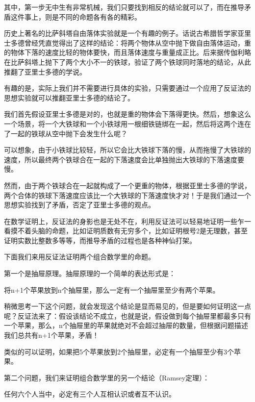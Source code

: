 \documentclass[export, 12pt, letterpaper]{ctexrep}
\newenvironment{shadedquotation}
 {\begin{shaded*}
  \quoting[leftmargin=5pt, rightmargin=5pt, vskip=0pt]
 }
 {\endquoting
 \end{shaded*}
}
\begin{document}
其中，第一步无中生有非常机械，我们只要找到相反的结论就可以了，而在推导矛盾这件事上，则是不同的命题各有各的精彩。

历史上著名的比萨斜塔自由落体实验就是一个有趣的例子。话说古希腊哲学家亚里士多德曾经凭直觉得出了这样的结论：将两个物体从空中抛下做自由落体运动，重的物体下落的速度比轻的物体要快，而且落体速度与重量成正比。后来据传伽利略在比萨斜塔上抛下了两个大小不一的铁球，验证了两个铁球同时落地的结论，从此推翻了亚里士多德的学说。

有趣的是，实际上我们并不需要进行具体的实验，只需要通过一个应用了反证法的思想实验就可以推翻亚里士多德的结论了。

我们首先假设亚里士多德是对的，也就是重的物体会下落得更快。然后，想象这么一个场景，将一个大铁球和一个小铁球用一根细铁链绑在一起，然后将这两个连在了一起的铁球从空中抛下会发生什么呢？

可以想象，由于小铁球比较轻，所以它会比大铁球下落的慢，从而拖慢了大铁球的速度，所以最终两个铁球合在一起的下落速度会比单独抛出大铁球的下落速度要慢。

然而，由于两个铁球合在一起就构成了一个更重的物体，根据亚里士多德的学说，两个合体的铁球下落速度应该比一个大铁球的下落速度快才对！于是我们通过一个思想实验找到了矛盾，否定了亚里士多德的观点。

在数学证明上，反证法的身影也是无处不在，利用反证法可以轻易地证明一些乍一看摸不着头脑的命题，比如证明质数有无穷多个，比如证明根号2是无理数，甚至证明实数比整数多等等，而推导矛盾的过程也是各种神仙打架。

下面我们来用反证法证明两个组合数学里的命题。

第一个是抽屉原理。抽屉原理的一个简单的表达形式是：

\begin{shadedquotation}
\noindent
将n+1个苹果放到n个抽屉里，那么一定有一个抽屉里至少有两个苹果。
\end{shadedquotation}


稍微思考一下这个问题，就会发现这个结论是显而易见的，但是要如何证明这一点呢？反证法来了：假设该结论不成立，也就是说，假设做到每个抽屉里都最多只有一个苹果，那么，n个抽屉里的苹果就绝对不会超过抽屉的数量，但根据问题描述我们总共有n+1个苹果，矛盾！

类似的可以证明，如果把5个苹果放到2个抽屉里，必定有一个抽屉至少有3个苹果。

第二个问题，我们来证明组合数学里的另一个结论（Ramsey定理）：

\begin{shadedquotation}
\noindent
任何六个人当中，必定有三个人互相认识或者互不认识。
\end{shadedquotation}
\end{document}
